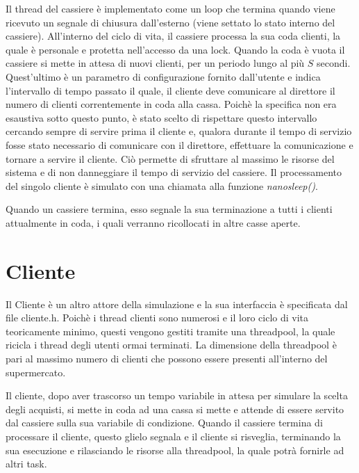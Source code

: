 \documentclass[11pt]{article}
\begin{document}
Il thread del cassiere è implementato come un loop che termina quando viene
ricevuto un segnale di chiusura dall'esterno (viene settato lo stato interno
del cassiere). All'interno del ciclo di vita, il cassiere processa la sua coda
clienti, la quale è personale e protetta nell'accesso da una lock. Quando la
coda è vuota il cassiere si mette in attesa di nuovi clienti, per un periodo
lungo al più $S$ secondi. Quest'ultimo è un parametro di configurazione fornito
dall'utente e indica l'intervallo di tempo passato il quale, il cliente deve
comunicare al direttore il numero di clienti correntemente in coda alla cassa.
Poichè la specifica non era esaustiva sotto questo punto, è stato scelto di
rispettare questo intervallo cercando sempre di servire prima il cliente e,
qualora durante il tempo di servizio fosse stato necessario di comunicare con
il direttore, effettuare la comunicazione e tornare a servire il cliente. Ciò
permette di sfruttare al massimo le risorse del sistema e di non danneggiare il
tempo di servizio del cassiere. Il processamento del singolo cliente è simulato
con una chiamata alla funzione \emph{nanosleep()}.

Quando un cassiere termina, esso segnale la sua terminazione a tutti i clienti
attualmente in coda, i quali verranno ricollocati in altre casse aperte.

\section{Cliente}
Il Cliente è un altro attore della simulazione e la sua interfaccia è
specificata dal file cliente.h. Poichè i thread clienti sono numerosi e il loro
ciclo di vita teoricamente minimo, questi vengono gestiti tramite una
threadpool, la quale ricicla i thread degli utenti ormai terminati. La
dimensione della threadpool è pari al massimo numero di clienti che possono
essere presenti all'interno del supermercato.

Il cliente, dopo aver trascorso un tempo variabile in attesa per simulare la
scelta degli acquisti, si mette in coda ad una cassa si mette e attende di 
essere servito dal cassiere sulla sua variabile di condizione. Quando il
cassiere termina di processare il cliente, questo glielo segnala e il cliente
si risveglia, terminando la sua esecuzione e rilasciando le risorse alla
threadpool, la quale potrà fornirle ad altri task.
\end{document}
